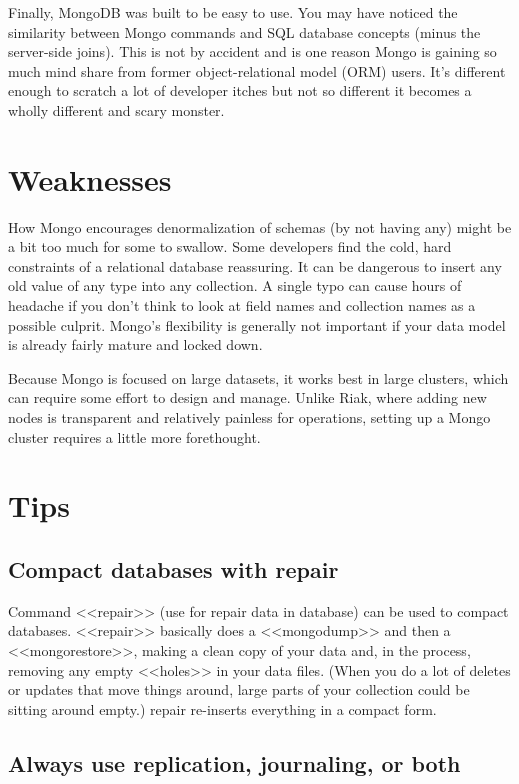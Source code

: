 Finally, MongoDB was built to be easy to use. You may have noticed the similarity between Mongo commands and SQL database concepts (minus the server-side joins). This is not by accident and is one reason Mongo is gaining so much mind share from former object-relational model (ORM) users. It’s different enough to scratch a lot of developer itches but not so different it becomes a wholly different and scary monster.\cite{seven_databases}

\section{Weaknesses}

How Mongo encourages denormalization of schemas (by not having any) might be a bit too much for some to swallow. Some developers find the cold, hard constraints of a relational database reassuring. It can be dangerous to insert any old value of any type into any collection. A single typo can cause hours of headache if you don’t think to look at field names and collection names as a possible culprit. Mongo’s flexibility is generally not important if your data model is already fairly mature and locked down.

Because Mongo is focused on large datasets, it works best in large clusters, which can require some effort to design and manage. Unlike Riak, where adding new nodes is transparent and relatively painless for operations, setting up a Mongo cluster requires a little more forethought.\cite{seven_databases}

\section{Tips}

\subsection{Compact databases with repair}

Command <<repair>> (use for repair data in database) can be used to compact databases. <<repair>> basically does a <<mongodump>> and then a <<mongorestore>>, making a clean copy of your data and, in the process, removing any empty <<holes>> in your data files. (When you do a lot of deletes or updates that move things around, large parts of your collection could be sitting around empty.) repair re-inserts everything in a compact form.\cite{mongodb_tips}

\subsection{Always use replication, journaling, or both}

